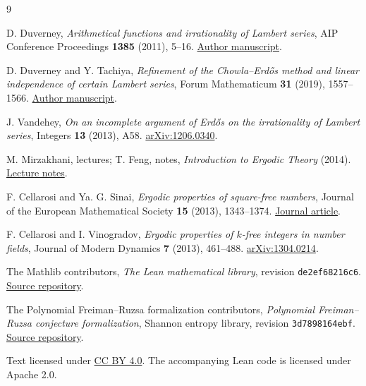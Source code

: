 \documentclass[11pt]{article}
\begin{document}
\begin{thebibliography}{9}
\small\raggedright
\setlength{\itemsep}{3pt}
D. Duverney, \emph{Arithmetical functions and irrationality of Lambert
series}, AIP Conference Proceedings \textbf{1385} (2011), 5--16.
\href{https://danielduverney.fr/documents/theorie-des-nombres/TokyoNT.pdf}{Author manuscript}.

D. Duverney and Y. Tachiya, \emph{Refinement of the Chowla--Erd\H{o}s
method and linear independence of certain Lambert series},
Forum Mathematicum \textbf{31} (2019), 1557--1566.
\href{https://danielduverney.fr/documents/theorie-des-nombres/DuverneyTachiya190522.pdf}{Author manuscript}.

J. Vandehey, \emph{On an incomplete argument of Erd\H{o}s on the
irrationality of Lambert series}, Integers \textbf{13} (2013), A58.
\href{https://arxiv.org/abs/1206.0340}{arXiv:1206.0340}.

M. Mirzakhani, lectures; T. Feng, notes, \emph{Introduction to Ergodic
Theory} (2014).
\href{https://math.berkeley.edu/~fengt/ergodic_theory.pdf}{Lecture notes}.

F. Cellarosi and Ya. G. Sinai, \emph{Ergodic properties of square-free
numbers}, Journal of the European Mathematical Society \textbf{15}
(2013), 1343--1374.
\href{https://ems.press/journals/jems/articles/11437}{Journal article}.

F. Cellarosi and I. Vinogradov, \emph{Ergodic properties of $k$-free
integers in number fields}, Journal of Modern Dynamics \textbf{7}
(2013), 461--488.
\href{https://arxiv.org/abs/1304.0214}{arXiv:1304.0214}.

The Mathlib contributors, \emph{The Lean mathematical library},
revision \texttt{de2ef68216c6}.
\href{https://github.com/leanprover-community/mathlib4/tree/de2ef68216c6074f338c8e61890ee0a379ddfb9b}{Source repository}.

The Polynomial Freiman--Ruzsa formalization contributors,
\emph{Polynomial Freiman--Ruzsa conjecture formalization},
Shannon entropy library, revision \texttt{3d7898164ebf}.
\href{https://github.com/teorth/pfr/tree/3d7898164ebff70a809dce618f9082a7b39e7850}{Source repository}.
\end{thebibliography}

\medskip
{\footnotesize Text licensed under
\href{https://creativecommons.org/licenses/by/4.0/}{CC BY 4.0}.
The accompanying Lean code is licensed under Apache 2.0.}
\end{document}
